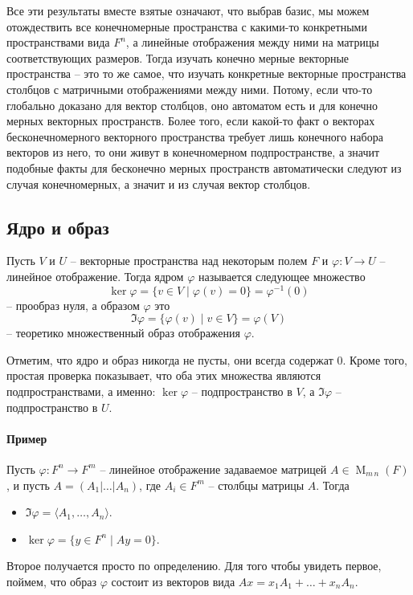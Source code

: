 Все эти результаты вместе взятые означают, что выбрав базис, мы можем отождествить все конечномерные пространства с какими-то конкретными пространствами вида $F^n$, а линейные отображения между ними на матрицы соответствующих размеров.
Тогда изучать конечно мерные векторные пространства -- это то же самое, что изучать конкретные векторные пространства столбцов с матричными отображениями между ними.
Потому, если что-то глобально доказано для вектор столбцов, оно автоматом есть и для конечно мерных векторных пространств.
Более того, если какой-то факт о векторах бесконечномерного векторного пространства требует лишь конечного набора векторов из него, то они живут в конечномерном подпространстве, а значит подобные факты для бесконечно мерных пространств автоматически следуют из случая конечномерных, а значит и из случая вектор столбцов.

\subsection{Ядро и образ}

\begin{definition}
Пусть $V$ и $U$ -- векторные пространства над некоторым полем $F$ и $\varphi\colon V\to U$ -- линейное отображение.
Тогда ядром $\varphi$ называется следующее множество
\[
\ker \varphi = \{v\in V \mid \varphi(v) = 0\} = \varphi^{-1}(0)
\]
-- прообраз нуля, а образом $\varphi$ это
\[
\Im \varphi = \{\varphi(v)\mid v\in V\} = \varphi(V)
\]
-- теоретико множественный образ отображения $\varphi$.
\end{definition}

Отметим, что ядро и образ никогда не пусты, они всегда содержат $0$.
Кроме того, простая проверка показывает, что оба этих множества являются подпространствами, а именно: $\ker\varphi$ -- подпространство в $V$, а $\Im \varphi $ -- подпространство в $U$.

\paragraph{Пример}

Пусть $\varphi \colon F^n\to F^m$ -- линейное отображение задаваемое матрицей $A\in\operatorname{M}_{m\,n}(F)$, и пусть $A = (A_1|\ldots|A_n)$, где $A_i\in F^m$ -- столбцы матрицы $A$.
Тогда
\begin{itemize}
\item $\Im \varphi = \langle A_1,\ldots,A_n\rangle$.
\item $\ker \varphi = \{y\in F^n\mid Ay = 0\}$.
\end{itemize}
Второе получается просто по определению.
Для того чтобы увидеть первое, поймем, что образ $\varphi$ состоит из векторов вида $Ax = x_1 A_1 + \ldots + x_n A_n$.


